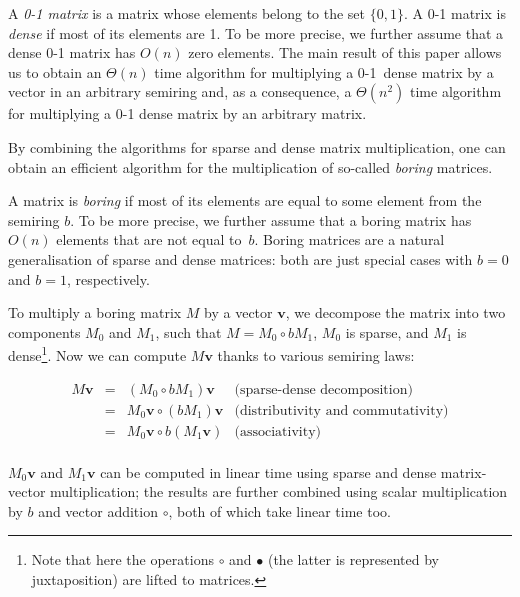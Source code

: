 \documentclass[11pt,letterpaper]{article}
\begin{document}
A \emph{0-1 matrix} is a matrix whose elements belong to the set $\{0,1\}$. A
0-1 matrix is \emph{dense} if most of its elements are 1. To be more precise, we
further assume that a dense 0-1 matrix has $O(n)$ zero elements. The main result
of this paper allows us to obtain an $\Theta(n)$ time algorithm for multiplying
a 0-1~dense matrix by a vector in an arbitrary semiring and, as a consequence, a
$\Theta(n^2)$ time algorithm for multiplying a 0-1 dense matrix by an arbitrary
matrix.


By combining the algorithms for sparse and dense matrix multiplication, one can
obtain an efficient algorithm for the multiplication of so-called \emph{boring}
matrices.

A matrix is \emph{boring} if most of its elements are equal to some element from
the semiring $b$. To be more precise, we further assume that a boring matrix has
$O(n)$ elements that are not equal to~$b$. Boring matrices are a natural
generalisation of sparse and dense matrices: both are just special cases with
$b=0$ and $b=1$, respectively.

To multiply a boring matrix $M$ by a vector $\mathbf{v}$, we decompose the
matrix into two components $M_0$ and $M_1$, such that $M = M_0 \circ b M_1$,
$M_0$ is sparse, and $M_1$ is dense\footnote{Note that here the operations
$\circ$ and $\bullet$ (the latter is represented by juxtaposition) are lifted to
matrices.}. Now we can compute $M \mathbf{v}$ thanks to various semiring laws:

\[
\begin{array}{rcll}
M \mathbf{v} & = & (M_0 \circ b M_1) \mathbf{v} & \text{(sparse-dense decomposition)}\\
 & = & M_0 \mathbf{v} \circ (b M_1) \mathbf{v} & \text{(distributivity and commutativity)}\\
 & = & M_0 \mathbf{v} \circ b (M_1 \mathbf{v}) & \text{(associativity)}\\
\end{array}
\]


\noindent
$M_0 \mathbf{v}$ and $M_1 \mathbf{v}$ can be computed in linear time using
sparse and dense matrix-vector multiplication; the results are further combined
using scalar multiplication by $b$ and vector addition $\circ$, both of which
take linear time too.
\end{document}
